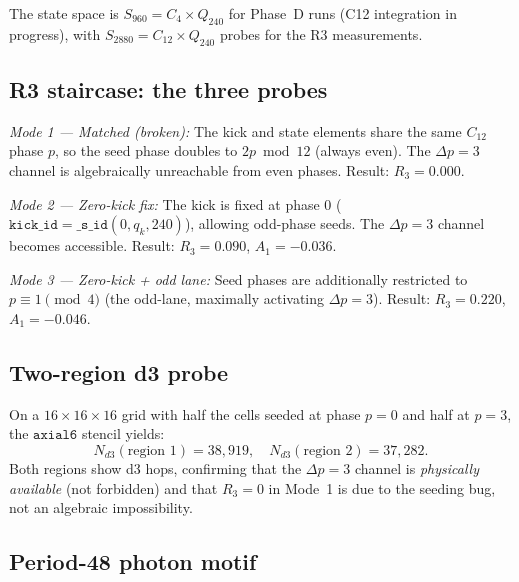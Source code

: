 The state space is $S_{960} = C_4 \times Q_{240}$ for Phase~D runs (C12 integration
in progress), with $S_{2880} = C_{12} \times Q_{240}$ probes for the R3 measurements.

\subsection{R3 staircase: the three probes}

\textit{Mode 1 — Matched (broken):} The kick and state elements share the same $C_{12}$
phase $p$, so the seed phase doubles to $2p \bmod 12$ (always even).  The $\Delta p = 3$
channel is algebraically unreachable from even phases.  Result: $R_3 = 0.000$.

\textit{Mode 2 — Zero-kick fix:} The kick is fixed at phase 0 ($\texttt{kick\_id} = \texttt{\_s\_id}(0, q_k, 240)$),
allowing odd-phase seeds.  The $\Delta p = 3$ channel becomes accessible.
Result: $R_3 = 0.090$, $A_1 = -0.036$.

\textit{Mode 3 — Zero-kick + odd lane:} Seed phases are additionally restricted to
$p \equiv 1 \pmod 4$ (the odd-lane, maximally activating $\Delta p = 3$).
Result: $R_3 = 0.220$, $A_1 = -0.046$.

\subsection{Two-region d3 probe}

On a $16 \times 16 \times 16$ grid with half the cells seeded at phase $p=0$ and half
at $p=3$, the $\texttt{axial6}$ stencil yields:
\begin{equation}
  N_{d3}(\text{region 1}) = 38{,}919, \quad N_{d3}(\text{region 2}) = 37{,}282 .
\end{equation}
Both regions show d3 hops, confirming that the $\Delta p = 3$ channel is \emph{physically
available} (not forbidden) and that $R_3 = 0$ in Mode~1 is due to the seeding bug,
not an algebraic impossibility.

\subsection{Period-48 photon motif}


